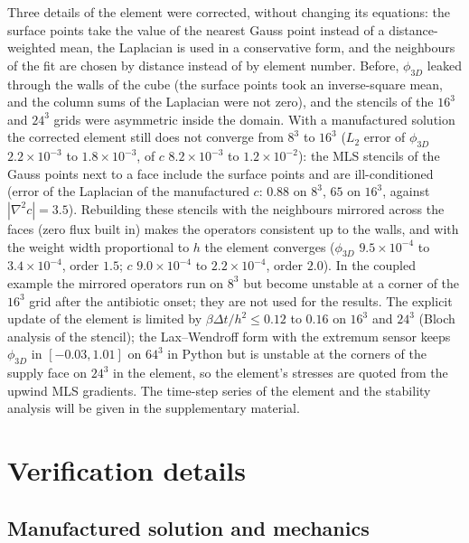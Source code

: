 \documentclass[11pt,a4paper]{article}
\newcommand{\phiD}{\phi_{3D}}
\begin{document}
Three details of the element were corrected, without changing its equations: the surface points take the value of the nearest Gauss point instead of a distance-weighted mean, the Laplacian is used in a conservative form, and the neighbours of the fit are chosen by distance instead of by element number. Before, $\phiD$ leaked through the walls of the cube (the surface points took an inverse-square mean, and the column sums of the Laplacian were not zero), and the stencils of the $16^3$ and $24^3$ grids were asymmetric inside the domain. With a manufactured solution the corrected element still does not converge from $8^3$ to $16^3$ ($L_2$ error of $\phiD$ $2.2\times10^{-3}$ to $1.8\times10^{-3}$, of $c$ $8.2\times10^{-3}$ to $1.2\times10^{-2}$): the MLS stencils of the Gauss points next to a face include the surface points and are ill-conditioned (error of the Laplacian of the manufactured $c$: $0.88$ on $8^3$, $65$ on $16^3$, against $|\nabla^2c|=3.5$). Rebuilding these stencils with the neighbours mirrored across the faces (zero flux built in) makes the operators consistent up to the walls, and with the weight width proportional to $h$ the element converges ($\phiD$ $9.5\times10^{-4}$ to $3.4\times10^{-4}$, order $1.5$; $c$ $9.0\times10^{-4}$ to $2.2\times10^{-4}$, order $2.0$). In the coupled example the mirrored operators run on $8^3$ but become unstable at a corner of the $16^3$ grid after the antibiotic onset; they are not used for the results. The explicit update of the element is limited by $\beta\Delta t/h^2\le0.12$ to $0.16$ on $16^3$ and $24^3$ (Bloch analysis of the stencil); the Lax--Wendroff form with the extremum sensor keeps $\phiD$ in $[-0.03,1.01]$ on $64^3$ in Python but is unstable at the corners of the supply face on $24^3$ in the element, so the element's stresses are quoted from the upwind MLS gradients. The time-step series of the element and the stability analysis will be given in the supplementary material.

\section{Verification details}
\label{app:verification}

\subsection{Manufactured solution and mechanics}
\label{app:mms}
\end{document}
